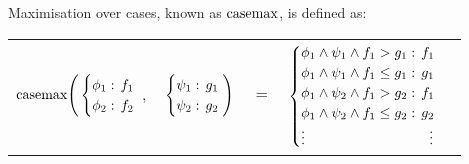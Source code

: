Maximisation over cases, known as $\mathrm{casemax}$, is defined as:
\vspace{-0.5em}
{\footnotesize 
    \abovedisplayskip=0pt
    \belowdisplayskip=0pt
    \begin{center}
        \begin{tabular}{r c c c l}
            \hspace{-7mm} 
            
            $\mathrm{casemax} \Bigg(
            \begin{cases}
            \phi_1: \hspace{-1mm} & \hspace{-1mm} f_1 \\ 
            \phi_2: \hspace{-1mm} & \hspace{-1mm} f_2 \\ 
            \end{cases}$
            $,$
            &
            \hspace{-4mm}
            $\begin{cases}
            \psi_1: \hspace{-1mm} & \hspace{-1mm} g_1 \\ 
            \psi_2: \hspace{-1mm} & \hspace{-1mm} g_2 \\ 
            \end{cases} \Bigg)$
            &
            \hspace{-4mm} 
            $ = $
            &
            \hspace{-4mm}
            $\begin{cases}
            \phi_1 \wedge \psi_1 \wedge f_1 > g_1    : & \hspace{-2mm} f_1 \\ 
            \phi_1 \wedge \psi_1 \wedge f_1 \leq g_1 : & \hspace{-2mm} g_1 \\ 
            \phi_1 \wedge \psi_2 \wedge f_1 > g_2    : & \hspace{-2mm} f_1 \\ 
            \phi_1 \wedge \psi_2 \wedge f_1 \leq g_2 : & \hspace{-2mm} g_2 \\ 
            \vdots & \vdots
            \end{cases}$
        \end{tabular}
    \end{center}
}%

